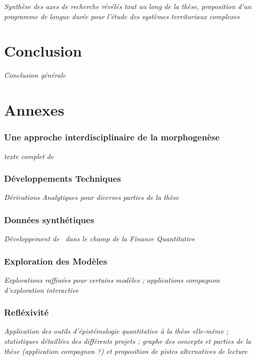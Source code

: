 \textit{Synthèse des axes de recherche révélés tout au long de la thèse, proposition d'un programme de longue durée pour l'étude des systèmes territoriaux complexes}



\part*{Conclusion}

\textit{Conclusion générale}



\part*{Annexes}


\section{Une approche interdisciplinaire de la morphogenèse}

\textit{texte complet de~\cite{antelope2016interdisciplinary}}


\section{Développements Techniques}


\textit{Dérivations Analytiques pour diverses parties de la thèse}


\section{Données synthétiques}

\textit{Développement de~\cite{raimbault2016generation} dans le champ de la Finance Quantitative}


\section{Exploration des Modèles}

\textit{Explorations raffinées pour certains modèles ; applications compagnon d'exploration interactive}


\section{Refléxivité}


\textit{Application des outils d'épistémologie quantitative à la thèse elle-même ; statistiques détaillées des différents projets ; graphe des concepts et parties de la thèse (application compagnon ?) et proposition de pistes alternatives de lecture}


